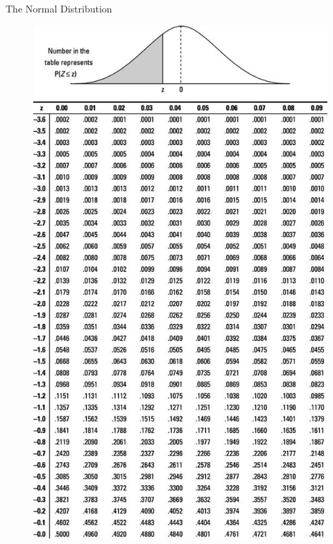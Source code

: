 \documentclass[handout]{beamer}
\begin{document}
\begin{frame}{The Normal Distribution}


  \begin{figure}[h!]
	\centering
	\includegraphics[scale=0.4]{pics/gaussianTable.jpg}
\end{figure}
 

\end{frame}
\end{document}
